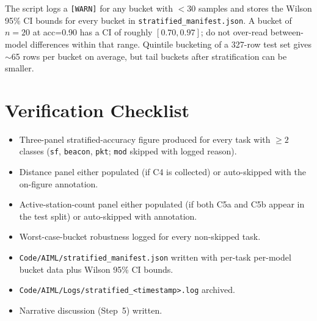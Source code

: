 \documentclass[11pt,letterpaper]{article}
\begin{document}
\begin{tcolorbox}[warning={Watch for Small-Bucket Artefacts}]
	The script logs a \texttt{[WARN]} for any bucket with $<$30 samples and stores the Wilson 95\% CI bounds for every bucket in \texttt{stratified\_manifest.json}. A bucket of $n=20$ at acc=0.90 has a CI of roughly $[0.70, 0.97]$; do not over-read between-model differences within that range. Quintile bucketing of a 327-row test set gives $\sim$65 rows per bucket on average, but tail buckets after stratification can be smaller.
\end{tcolorbox}

\section{Verification Checklist}
\begin{itemize}[leftmargin=2em]
	\item[$\square$] Three-panel stratified-accuracy figure produced for every task with $\geq 2$ classes (\texttt{sf}, \texttt{beacon}, \texttt{pkt}; \texttt{mod} skipped with logged reason).
	\item[$\square$] Distance panel either populated (if C4 is collected) or auto-skipped with the on-figure annotation.
	\item[$\square$] Active-station-count panel either populated (if both C5a and C5b appear in the test split) or auto-skipped with annotation.
	\item[$\square$] Worst-case-bucket robustness logged for every non-skipped task.
	\item[$\square$] \texttt{Code/AIML/stratified\_manifest.json} written with per-task per-model bucket data plus Wilson 95\% CI bounds.
	\item[$\square$] \texttt{Code/AIML/Logs/stratified\_<timestamp>.log} archived.
	\item[$\square$] Narrative discussion (Step~5) written.
\end{itemize}
\end{document}

